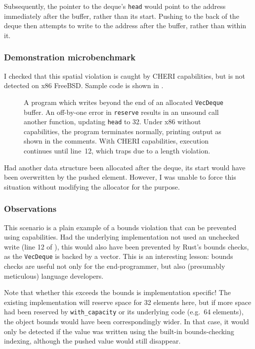 \documentclass[dissertation.tex]{subfiles}
\begin{document}
Subsequently, the pointer to the deque's \texttt{head} would point to
the address immediately after the buffer, rather than its start.
Pushing to the back of the deque then attempts to write to the address
after the buffer, rather than within it.

\subsubsection{Demonstration microbenchmark}
I checked that this spatial violation is caught by CHERI capabilities,
but is not detected on x86 FreeBSD.
Sample code is shown in .

\begin{figure}[ht]
    
    \caption{
        A program which writes beyond the end of an allocated
        \texttt{VecDeque} buffer.
        An off-by-one error in \texttt{reserve} results in an unsound
        call another function, updating \texttt{head} to 32.
        Under x86 without capabilities, the program terminates normally,
        printing output as shown in the comments.
        With CHERI capabilities, execution continues until line~12, which
        traps due to a length violation.
    }
    \label{lst:micro-capacity}
\end{figure}

Had another data structure been allocated after the deque, its start
would have been overwritten by the pushed element.
However, I was unable to force this situation without modifying the
allocator for the purpose.

\subsubsection{Observations}
This scenario is a plain example of a bounds violation that can be
prevented using capabilities.
Had the underlying implementation not used an unchecked write (line 12
of ), this would also have been prevented by Rust's
bounds checks, as the \texttt{VecDeque} is backed by a vector.
This is an interesting lesson: bounds checks are useful not only for the
end-programmer, but also (presumably meticulous) language developers.

Note that whether this exceeds the bounds is implementation specific!
The existing implementation will reserve space for 32 elements here, but
if more space had been reserved by \texttt{with\_capacity} or its
underlying code (e.g.\ 64 elements), the object bounds would have been
correspondingly wider.
In that case, it would only be detected if the value was written using
the built-in bounds-checking indexing, although the pushed value would
still disappear.
\end{document}
